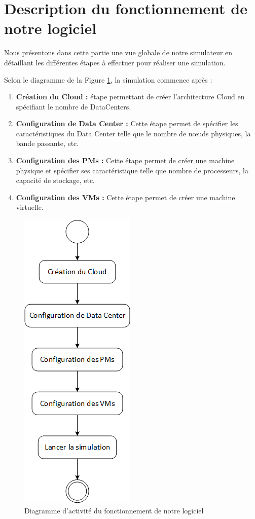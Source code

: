 \section{Description du fonctionnement de notre logiciel}
\begin{onehalfspace}
Nous présentons dans cette partie une vue globale de notre simulateur en détaillant les différentes étapes à effectuer pour réaliser une simulation.

Selon le diagramme de la Figure \ref{DiAFL}, la simulation commence après :

\begin{enumerate}
\item \textbf{Création du Cloud : } étape permettant de créer l’architecture Cloud en spécifiant le nombre de DataCenters.
\item \textbf{Configuration de Data Center : } Cette étape permet de spécifier les caractéristiques du Data Center telle que le nombre de nœuds physiques, la bande passante, etc.
\item  \textbf{Configuration des PMs : } Cette étape permet de créer une machine physique et spécifier ses caractéristique telle que nombre de processeurs, la capacité de stockage, etc.
\item  \textbf{Configuration des VMs : } Cette étape permet de créer une machine virtuelle.
\end{enumerate}
\begin{figure}[!h]
\begin{center}
\includegraphics[scale=0.95]{figures/9.png} 
\end{center}
\caption{Diagramme d’activité du fonctionnement de notre logiciel}
\label{DiAFL}
\end{figure}
\end{onehalfspace}

